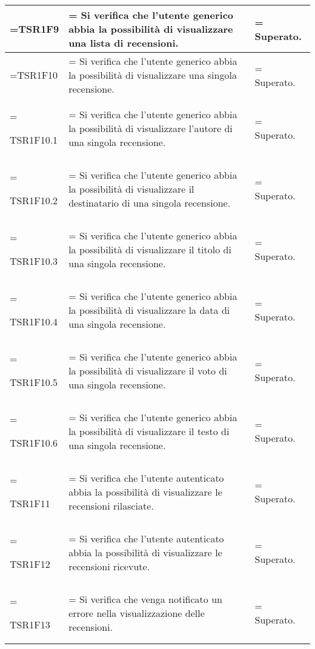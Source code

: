 \begin{xltabular}{\textwidth} {
            >{\hsize\linewidth=\hsize}X
            >{\hsize\linewidth=\hsize}X
            >{\hsize\linewidth=\hsize}X
        }
        TSR1F9 &
        Si verifica che l'utente generico abbia la possibilità di visualizzare una lista di recensioni.  &
        Superato.
        \\ \hline

        TSR1F10 &
        Si verifica che l'utente generico abbia la possibilità di visualizzare una singola recensione. &
        Superato.
        \\ \hline

        TSR1F10.1 &
        Si verifica che l'utente generico abbia la possibilità di visualizzare l'autore di una singola recensione.  &
        Superato.
        \\ \hline

        TSR1F10.2 &
        Si verifica che l'utente generico abbia la possibilità di visualizzare il destinatario di una singola recensione.  &
        Superato.
        \\ \hline

        TSR1F10.3 &
        Si verifica che l'utente generico abbia la possibilità di visualizzare il titolo di una singola recensione.  &
        Superato.
        \\ \hline

        TSR1F10.4 &
        Si verifica che l'utente generico abbia la possibilità di visualizzare la data di una singola recensione.  &
        Superato.
        \\ \hline
        
        TSR1F10.5 &
        Si verifica che l'utente generico abbia la possibilità di visualizzare il voto di una singola recensione.  &
        Superato.
        \\ \hline

        TSR1F10.6 &
        Si verifica che l'utente generico abbia la possibilità di visualizzare il testo di una singola recensione.  &
        Superato.
        \\ \hline

        TSR1F11 &
        Si verifica che l'utente autenticato abbia la possibilità di visualizzare le recensioni rilasciate.  &
        Superato.
        \\ \hline

        TSR1F12 &
        Si verifica che l'utente autenticato abbia la possibilità di visualizzare le recensioni ricevute.  &
        Superato.
        \\ \hline

        TSR1F13 &
        Si verifica che venga notificato un errore nella visualizzazione delle recensioni.  &
        Superato.
        \\ \hline


\end{xltabular}
